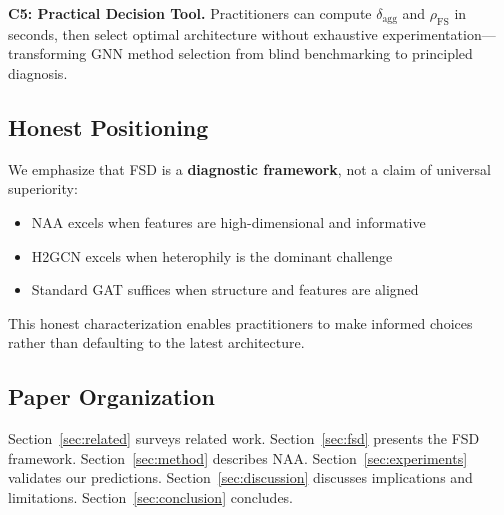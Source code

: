 \textbf{C5: Practical Decision Tool.} Practitioners can compute $\delta_{\text{agg}}$ and $\rho_{\text{FS}}$ in seconds, then select optimal architecture without exhaustive experimentation---transforming GNN method selection from blind benchmarking to principled diagnosis.

\subsection{Honest Positioning}

We emphasize that FSD is a \textbf{diagnostic framework}, not a claim of universal superiority:
\begin{itemize}
    \item NAA excels when features are high-dimensional and informative
    \item H2GCN excels when heterophily is the dominant challenge
    \item Standard GAT suffices when structure and features are aligned
\end{itemize}

This honest characterization enables practitioners to make informed choices rather than defaulting to the latest architecture.

\subsection{Paper Organization}

Section~\ref{sec:related} surveys related work. Section~\ref{sec:fsd} presents the FSD framework. Section~\ref{sec:method} describes NAA. Section~\ref{sec:experiments} validates our predictions. Section~\ref{sec:discussion} discusses implications and limitations. Section~\ref{sec:conclusion} concludes.
